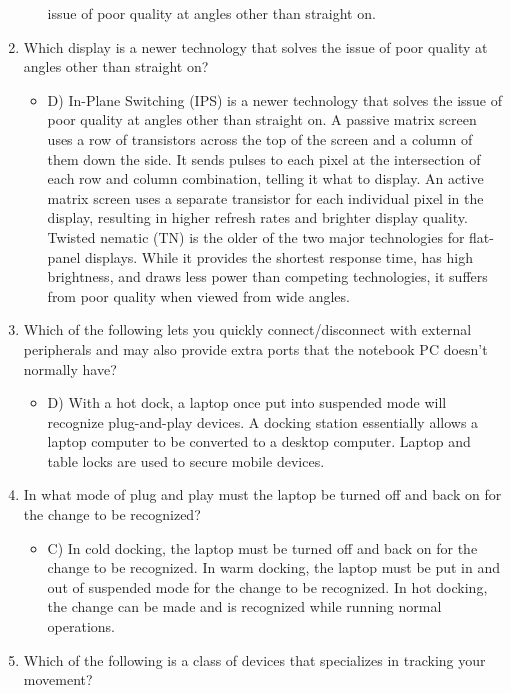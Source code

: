\documentclass{article}
\begin{document}
\begin{enumerate}
\begin{itemize}
issue of poor quality at angles other than straight on.
    \end{itemize}
    \item Which display is a newer technology that solves the issue of poor quality at angles other
than straight on?
    \begin{itemize}
        \item D) In-Plane Switching (IPS) is a newer technology that solves the issue of poor quality
at angles other than straight on. A passive matrix screen uses a row of transistors across
the top of the screen and a column of them down the side. It sends pulses to each pixel at
the intersection of each row and column combination, telling it what to display. An active
matrix screen uses a separate transistor for each individual pixel in the display, resulting in
higher refresh rates and brighter display quality. Twisted nematic (TN) is the older of the
two major technologies for flat-panel displays. While it provides the shortest response time,
has high brightness, and draws less power than competing technologies, it suffers from
poor quality when viewed from wide angles.
    \end{itemize}
    \item Which of the following lets you quickly connect/disconnect with external peripherals and
may also provide extra ports that the notebook PC doesn’t normally have?
    \begin{itemize}
        \item D) With a hot dock, a laptop once put into suspended mode will recognize plug-and-play
devices. A docking station essentially allows a laptop computer to be converted to a desktop
computer. Laptop and table locks are used to secure mobile devices.
    \end{itemize}
    \item In what mode of plug and play must the laptop be turned off and back on for the change to
be recognized?
    \begin{itemize}
        \item C) In cold docking, the laptop must be turned off and back on for the change to be
recognized. In warm docking, the laptop must be put in and out of suspended mode for the
change to be recognized. In hot docking, the change can be made and is recognized while
running normal operations.
    \end{itemize}
    \item Which of the following is a class of devices that specializes in tracking your movement?

\end{enumerate}
\end{document}

